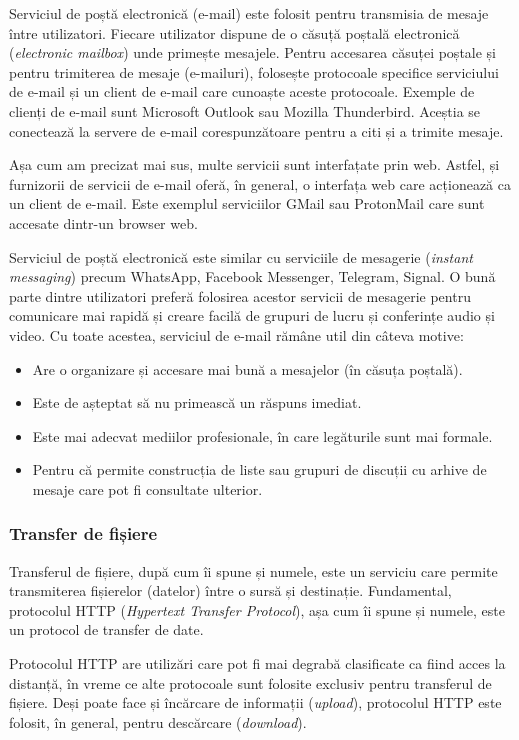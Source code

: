 Serviciul de poștă electronică (e-mail) este folosit pentru transmisia de mesaje între utilizatori.
Fiecare utilizator dispune de o căsuță poștală electronică (\textit{electronic mailbox}) unde primește mesajele.
Pentru accesarea căsuței poștale și pentru trimiterea de mesaje (e-mailuri), folosește protocoale specifice serviciului de e-mail și un client de e-mail care cunoaște aceste protocoale.
Exemple de clienți de e-mail sunt Microsoft Outlook sau Mozilla Thunderbird.
Aceștia se conectează la servere de e-mail corespunzătoare pentru a citi și a trimite mesaje.

Așa cum am precizat mai sus, multe servicii sunt interfațate prin web.
Astfel, și furnizorii de servicii de e-mail oferă, în general, o interfața web care acționează ca un client de e-mail.
Este exemplul serviciilor GMail sau ProtonMail care sunt accesate dintr-un browser web.

Serviciul de poștă electronică este similar cu serviciile de mesagerie (\textit{instant messaging}) precum WhatsApp, Facebook Messenger, Telegram, Signal.
O bună parte dintre utilizatori preferă folosirea acestor servicii de mesagerie pentru comunicare mai rapidă și creare facilă de grupuri de lucru și conferințe audio și video.
Cu toate acestea, serviciul de e-mail rămâne util din câteva motive:
\begin{itemize}
  \item Are o organizare și accesare mai bună a mesajelor (în căsuța poștală).
  \item Este de așteptat să nu primească un răspuns imediat.
  \item Este mai adecvat mediilor profesionale, în care legăturile sunt mai formale.
  \item Pentru că permite construcția de liste sau grupuri de discuții cu arhive de mesaje care pot fi consultate ulterior.
\end{itemize}

\subsubsection{Transfer de fișiere}
\label{sec:net:apps:other:file-transfer}

Transferul de fișiere, după cum îi spune și numele, este un serviciu care permite transmiterea fișierelor (datelor) între o sursă și destinație.
Fundamental, protocolul HTTP (\textit{Hypertext Transfer Protocol}), așa cum îi spune și numele, este un protocol de transfer de date.

Protocolul HTTP are utilizări care pot fi mai degrabă clasificate ca fiind acces la distanță, în vreme ce alte protocoale sunt folosite exclusiv pentru transferul de fișiere.
Deși poate face și încărcare de informații (\textit{upload}), protocolul HTTP este folosit, în general, pentru descărcare (\textit{download}).

